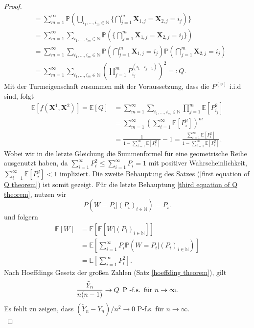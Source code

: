 \begin{proof}
\begin{align}
&=\sum_{m=1}^{\infty}\mathbb{P}(\bigcup_{i_1,...,i_m \in \mathbb{N}} \{\bigcap_{j=1}^{m}\textbf{X}_{1,j}=\textbf{X}_{2,j} = i_j) \}   \nonumber\\
&=\sum_{m=1}^{\infty}\sum_{i_1,...,i_m \in \mathbb{N}}\mathbb{P}(\{\bigcap_{j=1}^{m}\textbf{X}_{1,j}=\textbf{X}_{2,j} = i_j \}) \nonumber\\
&=\sum_{m=1}^{\infty}\sum_{i_1,...,i_m \in \mathbb{N}}\mathbb{P}(\bigcap_{j=1}^{m}\textbf{X}_{1,j} = i_j )\mathbb{P}(\bigcap_{j=1}^{m}\textbf{X}_{2,j} = i_j ) \nonumber\\
&=\sum_{m=1}^{\infty}\sum_{i_1,...,i_m \in \mathbb{N}}(\prod_{j=1}^{m}P_{i_j}^{(i_1...i_{j-1})})^2 =: Q \label{Gleichungskette Tiefe}.
\end{align}
Mit der Turmeigenschaft zusammen mit der Voraussetzung, dass die $P^{(v)}$ i.i.d sind, folgt 
\begin{align}
\mathbb{E}[f(\textbf{X}^1,\textbf{X}^2) ] = \mathbb{E}[Q] &=\sum_{m=1}^{\infty}\sum_{i_1,...,i_m \in \mathbb{N}}\prod_{j=1}^{m}\mathbb{E}[P_{i_j}^{2}] \nonumber\\
 &= \sum_{m=1}^{\infty}(\sum_{i =1}^{\infty}\mathbb{E}[P_{i}^{2}])^m \nonumber \\
 &= \frac{1}{1- \sum_{i=1}^{\infty}\mathbb{E}[P_i^2]}-1  = \frac{\sum_{i=1}^{\infty}\mathbb{E}[P_i^2]}{1- \sum_{i=1}^{\infty}\mathbb{E}[P_i^2]}  \nonumber.
\end{align}
Wobei wir in die letzte Gleichung die Summenformel für eine geometrische Reihe ausgenutzt haben, da $\sum_{i=1}^{\infty} P_i^2 \leq \sum_{i=1}^{\infty} P_i = 1$ mit positiver Wahrscheinlichkeit, $\sum_{i=1}^{\infty} \mathbb{E}[P_i^2] < 1$ impliziert. Die zweite Behauptung des Satzes (\ref{first equation of Q theorem}) ist somit gezeigt. Für die letzte Behauptung \ref{third equation of Q theorem}, nutzen wir 
\[
    P(W=P_i|(P_i)_{i \in \mathbb{N}}) = P_i.  
\]  
und folgern
\begin{align}
\mathbb{E}[W] &= \mathbb{E}[\mathbb{E}[W|(P_i)_{i \in \mathbb{N}}]] \\
&= \mathbb{E}[\sum_{i=1}^{\infty}P_i\mathbb{P}(W = P_i|(P_i)_{i \in \mathbb{N}})] \\
&= \mathbb{E}[\sum_{i=1}^{\infty}P_i^2].
\end{align}
Nach Hoeffdings Gesetz der großen Zahlen (Satz \ref{hoeffding theorem}), gilt
\[
    \frac{\tilde{Y}_n}{n(n-1)} \rightarrow Q \hspace{5pt} \textnormal{P -f.s.} \hspace{5pt} \textnormal{für } n \to \infty.
\]
Es fehlt zu zeigen, dass $(\tilde{Y}_n-Y_n)/n^2 \rightarrow 0 $ P-f.s. für $n \to \infty$. \\

\end{proof}
